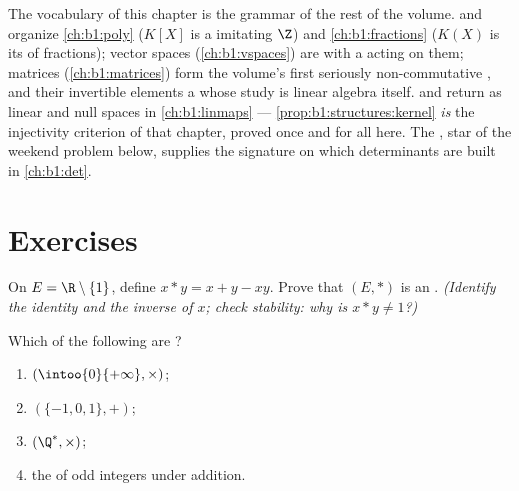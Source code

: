 \begin{remark}\label{rem:b1:structures:whereused}
The vocabulary of this chapter is the grammar of the rest of the
volume.  and  organize \cref{ch:b1:poly} ($K[X]$ is a
 imitating $\Z$) and \cref{ch:b1:fractions} ($K(X)$ is its
 of fractions); vector spaces (\cref{ch:b1:vspaces}) are
 with a  acting on them; matrices
(\cref{ch:b1:matrices}) form the volume's first seriously
non-commutative , and their invertible elements a  whose
study is linear algebra itself.  and  return as
linear  and null spaces in \cref{ch:b1:linmaps} ---
\cref{prop:b1:structures:kernel} \emph{is} the injectivity
criterion of that chapter, proved once and for all here. The
, star of the weekend problem below, supplies the
signature on which determinants are built in \cref{ch:b1:det}.
\end{remark}

\section{Exercises}

\begin{exercise}[$\star$]\label{exo:b1:structures:1}
On $E = \R \setminus \{1\}$, define $x * y = x + y - xy$. Prove that
$(E, *)$ is an . \emph{(Identify the identity and the
inverse of $x$; check stability: why is $x * y \neq 1$?)}
\end{exercise}

\begin{exercise}[$\star$]\label{exo:b1:structures:2}
Which of the following are ?
\begin{enumerate}
  \item $(\intoo{0}{+\infty}, \times)$;
  \item $(\{-1, 0, 1\}, +)$;
  \item $(\Q^*, \times)$;
  \item the  of odd integers under addition.
\end{enumerate}
\end{exercise}

